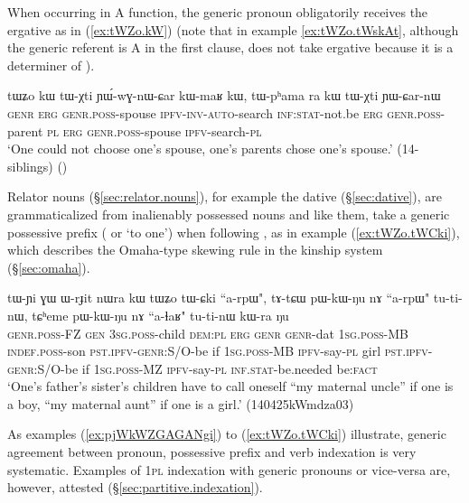 When occurring in A function, the generic pronoun  obligatorily receives the ergative  as in (\ref{ex:tWZo.kW}) (note that in example \ref{ex:tWZo.tWskAt}, although the generic referent is A in the first clause,  does not take ergative because it is a determiner of ). 

\begin{exe}
\ex \label{ex:tWZo.kW}
\gll tɯʑo kɯ tɯ-χti ɲɯ́-wɣ-nɯ-ɕar kɯ-maʁ kɯ,  tɯ-pʰama ra kɯ tɯ-χti ɲɯ-ɕar-nɯ \\
\textsc{genr} \textsc{erg} \textsc{genr}.\textsc{poss}-spouse \textsc{ipfv}-\textsc{inv}-\textsc{auto}-search \textsc{inf}:\textsc{stat}-not.be \textsc{erg} \textsc{genr}.\textsc{poss}-parent \textsc{pl} \textsc{erg} \textsc{genr}.\textsc{poss}-spouse \textsc{ipfv}-search-\textsc{pl}  \\
\glt `One could not choose one's spouse, one's parents chose one's spouse.' (14-siblings)
()
\end{exe} 

Relator nouns (§\ref{sec:relator.nouns}), for example the dative  (§\ref{sec:dative}),  are grammaticalized from inalienably possessed nouns and like them, take a generic possessive prefix ( or  `to one') when following , as in example (\ref{ex:tWZo.tWCki}), which describes the Omaha-type skewing rule in the kinship system (§\ref{sec:omaha}).

\begin{exe}
\ex \label{ex:tWZo.tWCki}
\gll
tɯ-ɲi ɣɯ ɯ-rɟit nɯra kɯ tɯʑo tɯ-ɕki ``a-rpɯ", tɤ-tɕɯ pɯ-kɯ-ŋu nɤ ``a-rpɯ" tu-ti-nɯ, tɕʰeme pɯ-kɯ-ŋu nɤ ``a-ɬaʁ" tu-ti-nɯ kɯ-ra ŋu \\
\textsc{genr}.\textsc{poss}-FZ \textsc{gen} \textsc{3sg}.\textsc{poss}-child \textsc{dem}:\textsc{pl} \textsc{erg} \textsc{genr} \textsc{genr}-dat \textsc{1sg}.\textsc{poss}-MB \textsc{indef}.\textsc{poss}-son \textsc{pst}.\textsc{ipfv}-\textsc{genr}:S/O-be if \textsc{1sg}.\textsc{poss}-MB \textsc{ipfv}-say-\textsc{pl} girl \textsc{pst}.\textsc{ipfv}-\textsc{genr}:S/O-be  if \textsc{1sg}.\textsc{poss}-MZ \textsc{ipfv}-say-\textsc{pl} \textsc{inf}.\textsc{stat}-be.needed be:\textsc{fact} \\
\glt `One's father's sister's children have to call oneself ``my maternal uncle'' if one is a boy, ``my maternal aunt'' if one is a girl.'  (140425kWmdza03)
\end{exe} 

As examples (\ref{ex:pjWkWZGAGANgi}) to (\ref{ex:tWZo.tWCki}) illustrate, generic agreement between pronoun, possessive prefix and verb indexation is very systematic. Examples of \textsc{1pl} indexation with generic pronouns or vice-versa are, however, attested (§\ref{sec:partitive.indexation}).

